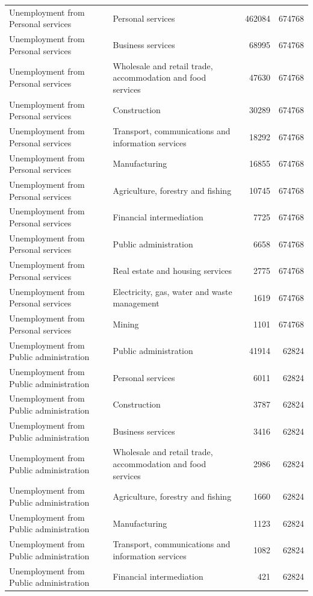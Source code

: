 \begin{longtable}{llrr}
Unemployment from Personal services & Personal services & 462084 & 674768 \\
Unemployment from Personal services & Business services & 68995 & 674768 \\
Unemployment from Personal services & Wholesale and retail trade, accommodation and food services & 47630 & 674768 \\
Unemployment from Personal services & Construction & 30289 & 674768 \\
Unemployment from Personal services & Transport, communications and information services & 18292 & 674768 \\
Unemployment from Personal services & Manufacturing & 16855 & 674768 \\
Unemployment from Personal services & Agriculture, forestry and fishing & 10745 & 674768 \\
Unemployment from Personal services & Financial intermediation & 7725 & 674768 \\
Unemployment from Personal services & Public administration & 6658 & 674768 \\
Unemployment from Personal services & Real estate and housing services & 2775 & 674768 \\
Unemployment from Personal services & Electricity, gas, water and waste management & 1619 & 674768 \\
Unemployment from Personal services & Mining & 1101 & 674768 \\
Unemployment from Public administration & Public administration & 41914 & 62824 \\
Unemployment from Public administration & Personal services & 6011 & 62824 \\
Unemployment from Public administration & Construction & 3787 & 62824 \\
Unemployment from Public administration & Business services & 3416 & 62824 \\
Unemployment from Public administration & Wholesale and retail trade, accommodation and food services & 2986 & 62824 \\
Unemployment from Public administration & Agriculture, forestry and fishing & 1660 & 62824 \\
Unemployment from Public administration & Manufacturing & 1123 & 62824 \\
Unemployment from Public administration & Transport, communications and information services & 1082 & 62824 \\
Unemployment from Public administration & Financial intermediation & 421 & 62824 \\

\end{longtable}
